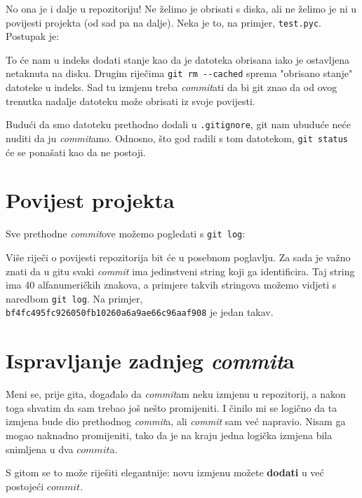 No ona je i dalje u repozitoriju!
Ne želimo je obrisati s diska, ali ne želimo je ni u povijesti projekta (od sad pa na dalje).
Neka je to, na primjer, \verb+test.pyc+.
Postupak je:


To će nam u indeks dodati stanje kao da je datoteka obrisana iako je ostavljena netaknuta na disku.
Drugim riječima \verb+git rm --cached+ sprema "obrisano stanje" datoteke u indeks.
Sad tu izmjenu treba \emph{commit}ati da bi git znao da od ovog trenutka nadalje datoteku može obrisati iz svoje povijesti.

Budući da smo datoteku prethodno dodali u \verb+.gitignore+, git nam ubuduće neće nuditi da ju \emph{commit}amo.
Odnosno, što god radili s tom datotekom, \verb+git status+ će se ponašati kao da ne postoji.

\section*{Povijest projekta}

Sve prethodne \emph{commit}ove možemo pogledati s \verb+git log+:



Više riječi o povijesti repozitorija bit će u posebnom poglavlju. 
Za sada je važno znati da u gitu svaki \emph{commit} ima jedinstveni string koji ga identificira.
Taj string ima 40 alfanumeričkih znakova, a primjere takvih stringova možemo vidjeti s naredbom \verb+git log+.
Na primjer, \\\verb+bf4fc495fc926050fb10260a6a9ae66c96aaf908+ je jedan takav.

\section*{Ispravljanje zadnjeg \emph{commit}a}

Meni se, prije gita, događalo da \emph{commit}am neku izmjenu u repozitorij, a nakon toga shvatim da sam trebao još nešto promijeniti.
I činilo mi se logično da ta izmjena bude dio prethodnog \emph{commit}a, ali \emph{commit} sam već napravio.
Nisam ga mogao naknadno promijeniti, tako da je na kraju jedna logička izmjena bila snimljena u dva $commit$a.

S gitom se to može riješiti elegantnije: novu izmjenu možete \textbf{dodati} u već postojeći $commit$.

